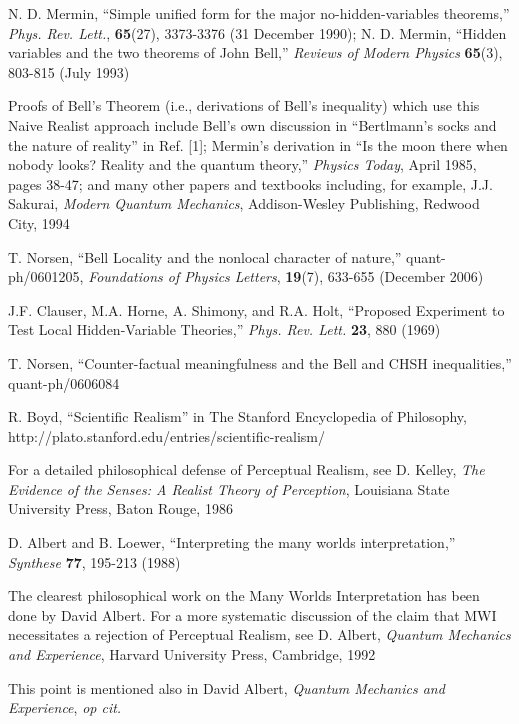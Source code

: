 \documentclass[12pt]{article}
\begin{document}
\begin{thebibliography}{00}
N. D. Mermin, ``Simple unified form for the major no-hidden-variables
theorems,'' \emph{Phys. Rev. Lett.}, {\bf{65}}(27), 3373-3376 (31 
December 1990);  N. D. Mermin, ``Hidden variables and the two
theorems of John Bell,'' \emph{Reviews of Modern Physics}
{\bf{65}}(3), 803-815 (July 1993)

  Proofs of Bell's Theorem (i.e., derivations of
  Bell's inequality) which use this Naive Realist approach include
  Bell's own discussion in ``Bertlmann's socks and the nature of
  reality'' in Ref. [1]; Mermin's derivation in ``Is the moon there
  when nobody looks? Reality and the quantum theory,'' \emph{Physics Today},
  April 1985, pages 38-47; and many other papers and
  textbooks including, for example, 
  J.J. Sakurai, \emph{Modern Quantum Mechanics}, Addison-Wesley 
  Publishing, Redwood City, 1994

T. Norsen, ``Bell Locality and the nonlocal character of nature,''
quant-ph/0601205, \emph{Foundations of Physics Letters}, {\bf{19}}(7),
633-655 (December 2006)

J.F. Clauser, M.A. Horne, A. Shimony, and R.A. Holt,
``Proposed Experiment to Test Local Hidden-Variable Theories,''
\emph{Phys. Rev. Lett.} {\bf{23}}, 880 (1969)

T. Norsen, ``Counter-factual meaningfulness and the Bell and CHSH
inequalities,'' quant-ph/0606084


R. Boyd, ``Scientific Realism'' in The Stanford Encyclopedia of
Philosophy, http://plato.stanford.edu/entries/scientific-realism/


For a detailed philosophical defense of Perceptual Realism, see D.
Kelley, \emph{The Evidence of the Senses: A Realist Theory of
  Perception},  Louisiana State University Press, Baton Rouge, 1986


D. Albert and B. Loewer, ``Interpreting the many worlds
interpretation,'' \emph{Synthese} {\bf{77}}, 195-213 (1988)


  The clearest philosophical work on the Many Worlds
  Interpretation has been done by David Albert.  For a more systematic
  discussion of the claim that MWI necessitates a rejection of
  Perceptual Realism, see D. Albert, \emph{Quantum Mechanics and
  Experience}, Harvard University Press, Cambridge, 1992

  This point is mentioned also in David Albert,
  \emph{Quantum Mechanics and Experience}, \emph{op cit.}



\end{thebibliography}
\end{document}
